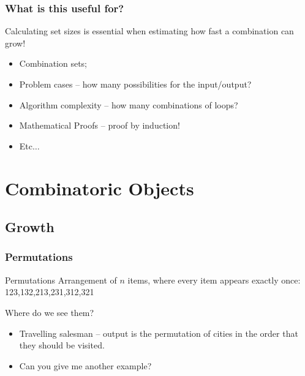 \documentclass{beamer}
\begin{document}
\begin{frame}
  \frametitle{What is this useful for?}
  \begin{block}{}
    Calculating set sizes is essential when estimating how fast a combination can grow!
  \end{block}
  \medskip
  {\small
  \begin{itemize}
  \item Combination sets;
  \item Problem cases -- how many possibilities for the input/output?
  \item Algorithm complexity -- how many combinations of loops?
  \item Mathematical Proofs -- proof by induction!
  \item Etc$\ldots$
  \end{itemize}
  }
\end{frame}

\section{Combinatoric Objects}
\subsection{Growth}

\begin{frame}
  \frametitle{Permutations}
  \begin{block}{Permutations}
    Arrangement of $n$ items, where every item appears exactly once:\\
    123,132,213,231,312,321
  \end{block}
  \vfill

  \begin{block}{Where do we see them?}
    \begin{itemize}
    \item Travelling salesman -- output is the permutation of cities
      in the order that they should be visited.
    \item Can you give me another example?
    \end{itemize}
  \end{block}
\end{frame}
\end{document}
